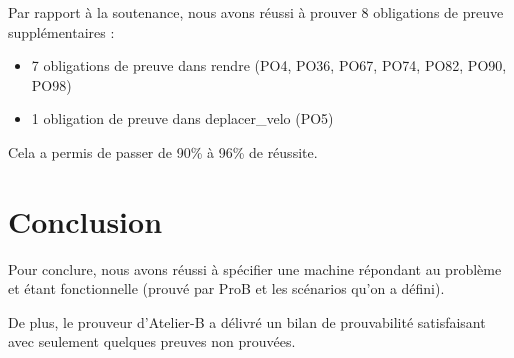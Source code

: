 \documentclass[12pt]{article}
\begin{document}
Par rapport à la soutenance, nous avons réussi à prouver 8 obligations de preuve supplémentaires : 
\begin{itemize}
  \item 7 obligations de preuve dans rendre (PO4, PO36, PO67, PO74, PO82, PO90, PO98)
  \item 1 obligation de preuve dans deplacer\_velo (PO5)
\end{itemize}

Cela a permis de passer de 90\% à 96\% de réussite.

\newpage
\section{Conclusion}
Pour conclure, nous avons réussi à spécifier une machine répondant au problème et étant fonctionnelle (prouvé par ProB et les scénarios qu'on a défini).

De plus, le prouveur d'Atelier-B a délivré un bilan de prouvabilité satisfaisant avec seulement quelques preuves non prouvées.
\end{document}
